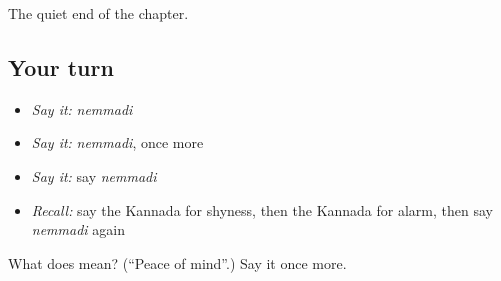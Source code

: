 \begin{grammarlens}[title={What you've built}]
The quiet end of the chapter.
\end{grammarlens}

\subsection*{Your turn}
\begin{itemize}
\raggedright
  \item \emph{Say it:} \emph{nemmadi}
  \item \emph{Say it:} \emph{nemmadi}, once more
  \item \emph{Say it:} say \emph{nemmadi}
  \item \emph{Recall:} say the Kannada for shyness, then the Kannada for alarm, then say \emph{nemmadi} again
\end{itemize}

\begin{tcolorbox}[breakable,colback=teal!4,colframe=teal!35!black,title={Before you move on}]
What does  mean? (\textquotedblleft{}Peace of mind\textquotedblright{}.) Say it once more.
\end{tcolorbox}
